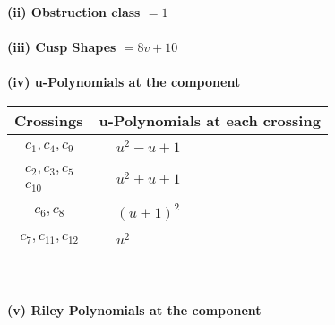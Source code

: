 \documentclass[1p]{elsarticle_modified}
\theoremstyle{definition}
\begin{document}
\flushleft \textbf{(ii) Obstruction class $= 1$}\\~\\
\flushleft \textbf{(iii) Cusp Shapes $= 8 v+10$}\\~\\
\newpage\renewcommand{\arraystretch}{1}
\flushleft \textbf{(iv) u-Polynomials at the component}\newline \\
\begin{tabular}{m{50pt}|m{274pt}}
Crossings & \hspace{64pt}u-Polynomials at each crossing \\
\hline $$\begin{aligned}c_{1},c_{4},c_{9}\end{aligned}$$&$\begin{aligned}
&u^2- u+1
\end{aligned}$\\
\hline $$\begin{aligned}c_{2},c_{3},c_{5}\\c_{10}\end{aligned}$$&$\begin{aligned}
&u^2+u+1
\end{aligned}$\\
\hline $$\begin{aligned}c_{6},c_{8}\end{aligned}$$&$\begin{aligned}
&(u+1)^2
\end{aligned}$\\
\hline $$\begin{aligned}c_{7},c_{11},c_{12}\end{aligned}$$&$\begin{aligned}
&u^2
\end{aligned}$\\
\hline
\end{tabular}\\~\\
\newpage\renewcommand{\arraystretch}{1}
\flushleft \textbf{(v) Riley Polynomials at the component}\newline \\
\end{document}
